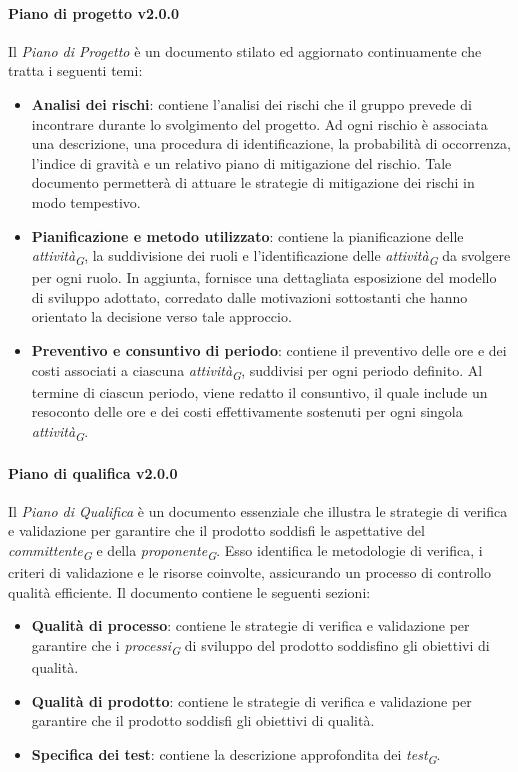 \paragraph{Piano di progetto v2.0.0}
Il \textit{Piano di Progetto} è un documento stilato ed aggiornato continuamente che tratta i seguenti temi: 
\begin{itemize}
    \item \textbf{Analisi dei rischi}: contiene l'analisi dei rischi che il gruppo prevede di incontrare durante lo svolgimento del progetto. Ad ogni rischio è associata una descrizione, una procedura di identificazione, la probabilità di occorrenza, l'indice di gravità e un relativo piano di mitigazione del rischio. Tale documento permetterà di attuare le strategie di mitigazione dei rischi in modo tempestivo.
    \item \textbf{Pianificazione e metodo utilizzato}: contiene la pianificazione delle \textit{attività}\textsubscript{\textit{G}}, la suddivisione dei ruoli e l'identificazione delle \textit{attività}\textsubscript{\textit{G}} da svolgere per ogni ruolo. In aggiunta, fornisce una dettagliata esposizione del modello di sviluppo adottato, corredato dalle motivazioni sottostanti che hanno orientato la decisione verso tale approccio.
    \item \textbf{Preventivo e consuntivo di periodo}: contiene il preventivo  delle ore e dei costi associati a ciascuna \textit{attività}\textsubscript{\textit{G}}, suddivisi per ogni periodo definito. Al termine di ciascun periodo, viene redatto il consuntivo, il quale include un resoconto delle ore e dei costi effettivamente sostenuti per ogni singola \textit{attività}\textsubscript{\textit{G}}.
\end{itemize}

\paragraph{Piano di qualifica v2.0.0}
Il \textit{Piano di Qualifica} è un documento essenziale che illustra le strategie di verifica e validazione per garantire che il prodotto soddisfi le aspettative del \textit{committente}\textsubscript{\textit{G}} e della \textit{proponente}\textsubscript{\textit{G}}. Esso identifica le metodologie di verifica, i criteri di validazione e le risorse coinvolte, assicurando un processo di controllo qualità efficiente.  
Il documento contiene le seguenti sezioni:  
\begin{itemize}
    \item \textbf{Qualità di processo}: contiene le strategie di verifica e validazione per garantire che i \textit{processi}\textsubscript{\textit{G}} di sviluppo del prodotto soddisfino gli obiettivi di qualità.
    \item \textbf{Qualità di prodotto}: contiene le strategie di verifica e validazione per garantire che il prodotto soddisfi gli obiettivi di qualità.
    \item \textbf{Specifica dei test}: contiene la descrizione approfondita dei \textit{test}\textsubscript{\textit{G}}. 
\end{itemize}

